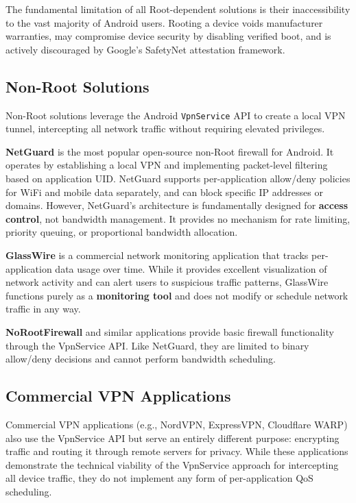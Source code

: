 The fundamental limitation of all Root-dependent solutions is their inaccessibility to the vast majority of Android users. Rooting a device voids manufacturer warranties, may compromise device security by disabling verified boot, and is actively discouraged by Google's SafetyNet attestation framework.

\subsection{Non-Root Solutions}

Non-Root solutions leverage the Android \texttt{VpnService} API to create a local VPN tunnel, intercepting all network traffic without requiring elevated privileges.

\textbf{NetGuard} \cite{netguard} is the most popular open-source non-Root firewall for Android. It operates by establishing a local VPN and implementing packet-level filtering based on application UID. NetGuard supports per-application allow/deny policies for WiFi and mobile data separately, and can block specific IP addresses or domains. However, NetGuard's architecture is fundamentally designed for \textbf{access control}, not bandwidth management. It provides no mechanism for rate limiting, priority queuing, or proportional bandwidth allocation.

\textbf{GlassWire} \cite{glasswire} is a commercial network monitoring application that tracks per-application data usage over time. While it provides excellent visualization of network activity and can alert users to suspicious traffic patterns, GlassWire functions purely as a \textbf{monitoring tool} and does not modify or schedule network traffic in any way.

\textbf{NoRootFirewall} and similar applications provide basic firewall functionality through the VpnService API. Like NetGuard, they are limited to binary allow/deny decisions and cannot perform bandwidth scheduling.

\subsection{Commercial VPN Applications}

Commercial VPN applications (e.g., NordVPN, ExpressVPN, Cloudflare WARP) also use the VpnService API but serve an entirely different purpose: encrypting traffic and routing it through remote servers for privacy. While these applications demonstrate the technical viability of the VpnService approach for intercepting all device traffic, they do not implement any form of per-application QoS scheduling.

